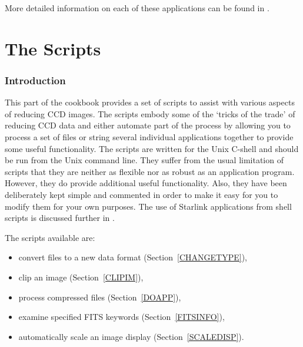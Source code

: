 \documentclass[twoside,11pt]{starlink}
\begin{document}
More detailed information on each of these applications can be found in
\/\cite{SUN139}.


\cleardoublepage

\part{The Scripts}

\section{\label{SUMSC}Introduction}

This part of the cookbook provides a set of scripts to assist with
various aspects of reducing CCD images.  The scripts embody some of the
`tricks of the trade' of reducing CCD data and either automate part of
the process by allowing you to process a set of files or string several
individual applications together to provide some useful functionality.
The scripts are written for the Unix C-shell and should be run from the
Unix command line.  They suffer from the usual limitation of scripts
that they are neither as flexible nor as robust as an application program.
However, they do provide additional useful functionality.  Also, they
have been deliberately kept simple and commented in order to make it
easy for you to  modify them for your own purposes.  The use of Starlink
applications from shell scripts is discussed further in \cite{SC4}.

The scripts available are:

\begin{itemize}

  \item convert files to a new data format (Section~\ref{CHANGETYPE}),

  \item clip an image (Section~\ref{CLIPIM}),

  \item process compressed files (Section~\ref{DOAPP}),

  \item examine specified FITS keywords (Section~\ref{FITSINFO}),

  \item automatically scale an image display (Section~\ref{SCALEDISP}).

\end{itemize}
\end{document}
